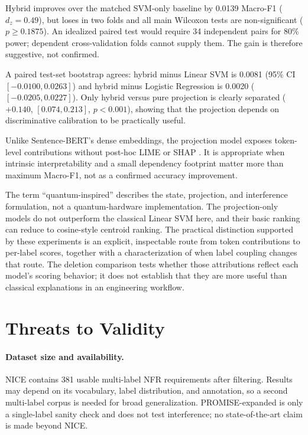 \documentclass[runningheads]{llncs}
\begin{document}
Hybrid improves over the matched SVM-only baseline by 0.0139 Macro-F1
($d_z=0.49$), but loses in two folds and all main Wilcoxon tests are
non-significant ($p\geq0.1875$). An idealized paired test would require 34
independent pairs for 80\% power; dependent cross-validation folds cannot
supply them. The gain is therefore suggestive, not confirmed.

A paired test-set bootstrap agrees: hybrid minus Linear SVM is 0.0081
(95\% CI $[-0.0100,0.0263]$) and hybrid minus Logistic Regression is 0.0020
($[-0.0205,0.0227]$). Only hybrid versus pure projection is clearly separated
($+0.140$, $[0.074,0.213]$, $p<0.001$), showing that the projection depends on
discriminative calibration to be practically useful.

Unlike Sentence-BERT's dense embeddings, the projection model exposes
token-level contributions without post-hoc LIME \cite{ribeiro2016lime} or SHAP
\cite{lundberg2017shap}. It is appropriate when intrinsic interpretability and
a small dependency footprint matter more than maximum Macro-F1, not as a
confirmed accuracy improvement.

The term ``quantum-inspired'' describes the state, projection, and interference
formulation, not a quantum-hardware implementation. The projection-only models
do not outperform the classical Linear SVM here, and their basic ranking can
reduce to cosine-style centroid ranking. The practical distinction supported
by these experiments is an explicit, inspectable route from token contributions
to per-label scores, together with a characterization of when label coupling
changes that route. The deletion comparison tests whether those attributions
reflect each model's scoring behavior; it does not establish that they are
more useful than classical explanations in an engineering workflow.

\section{Threats to Validity}
\paragraph{Dataset size and availability.} NICE contains 381 usable multi-label
NFR requirements after filtering. Results may depend on its vocabulary, label
distribution, and annotation, so a second multi-label corpus is needed for
broad generalization. PROMISE-expanded is only a single-label sanity check and
does not test interference; no state-of-the-art claim is made beyond NICE.
\end{document}
